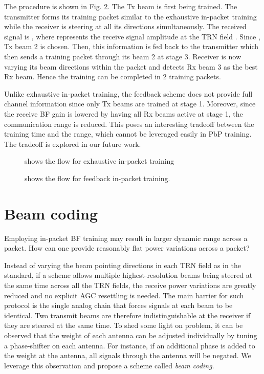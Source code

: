 \documentclass[10pt,conference]{IEEEtran}
\begin{document}
The procedure is shown in Fig. \ref{fig:in_packet_feedback}. The Tx beam is first being trained. The transmitter forms its training packet similar to the exhaustive in-packet training while the receiver is steering at all its directions simultaneously. The received signal is , where  represents the receive signal amplitude at the TRN field . Since , Tx beam 2 is chosen. Then, this information is fed back to the transmitter which then sends a training packet through its beam 2 at stage 3. Receiver is now varying its beam directions within the packet and detects Rx beam 3 as the best Rx beam. Hence the training can be completed in 2 training packets.

Unlike exhaustive in-packet training, the feedback scheme does not provide full channel information since only Tx beams are trained at stage 1. Moreover, since the receive BF gain is lowered by having all Rx beams active at stage 1, the communication range is reduced. This poses an interesting tradeoff between the training time and the range, which cannot be leveraged easily in PbP training. The tradeoff is explored in our future work.

\begin{figure}
\centering
{}
\vspace{-6pt}
\caption{shows the flow for exhaustive in-packet training}\label{fig:exhaustive_inpacket}
\vspace{+4pt}
\end{figure}
\begin{figure}
\centering
{}
\caption{shows the flow for feedback in-packet training.}\label{fig:in_packet_feedback}
\end{figure}

\section{Beam coding}
Employing in-packet BF training may result in larger dynamic range across a packet. How can one provide reasonably flat power variations across a packet?

Instead of varying the beam pointing directions in each TRN field as in the standard, if a scheme allows multiple highest-resolution beams being steered at the same time across all the TRN fields, the receive power variations are greatly reduced and no explicit AGC resettling is needed. The
main barrier for such protocol is the single analog chain that forces signals at each beam to be identical. Two transmit beams are
therefore indistinguishable at the receiver if they are steered at the same time. To shed some light on problem, it can be observed that the weight of each
antenna can be adjusted individually by tuning a phase-shifter on each antenna. For instance, if an additional phase  is added to the weight
at the  antenna, all signals through the  antenna
will be negated. We leverage this observation and propose a scheme called \emph{beam coding}.
\end{document}
